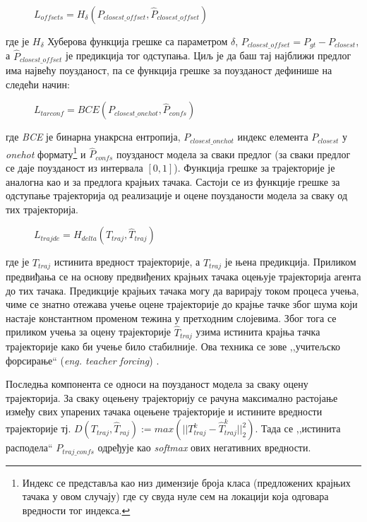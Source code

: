 \documentclass[11pt,oneside]{memoir}
\begin{document}
\begin{figure}[H]
  \centering
  $L_{offsets} = H_{\delta}(P_{closest\_offset}, \hat{P}_{closest\_offset})$
\end{figure}

\noindent где је $H_{\delta}$ Хуберова функција грешке са параметром $\delta$, $P_{closest\_offset} = P_{gt} - P_{closest}$,
а $\hat{P}_{closest\_offset}$ је предикција тог одступања. Циљ је да баш тај најближи предлог има највећу поузданост, па се функција грешке за 
поузданост дефинише на следећи начин:

\begin{figure}[H]
  \centering
  $L_{tarconf} = BCE(P_{closest\_onehot}, \hat{P}_{confs})$
\end{figure}

\noindent где \textit{BCE} је бинарна унакрсна ентропија, $P_{closest\_onehot}$ индекс елемента $P_{closest}$ у \textit{onehot} 
формату\footnote{Индекс се представља као низ димензије броја класа (предложених крајњих тачака у овом случају) где су свуда нуле сем на локацији која одговара
вредности тог индекса.} и $\hat{P}_{confs}$ поузданост модела за сваки предлог (за сваки предлог се даје поузданост из интервала $[0, 1]$). Функција грешке за
трајекторије је аналогна као и за предлога крајњих тачака. Састоји се из функције грешке за одступање трајекторија од реализације и оцене
поузданости модела за сваку од тих трајекторија.

\begin{figure}[H]
  \centering
  $L_{trajde} = H_{delta} (T_{traj}, \hat{T}_{traj})$
\end{figure}

\noindent где је $T_{traj}$ истинита вредност трајекторије, а $\hat{T}_{traj}$ је њена предикција. Приликом предвиђања се
на основу предвиђених крајњих тачака оцењује трајекторија агента до тих тачака. Предикције крајњих тачака могу да варирају током процеса учења,
чиме се знатно отежава учење оцене трајекторије до крајње тачке због шума који настаје константном променом тежина у претходним слојевима.
Због тога се приликом учења за оцену трајекторије
$\hat{T}_{traj}$ узима истинита крајња тачка трајекторије како би учење било стабилније. Ова техника се зове ,,учитељско форсирање`` (\textit{eng. teacher forcing}) \cite{teacher_forcing}.

Последња компонента се односи на поузданост модела за сваку оцену трајекторија. За сваку оцењену трајекторију се рачуна максимално растојање
између свих упарених тачака оцењене трајекторије и истините вредности трајекторије тј.
$D(T_{traj}, \hat{T}_{raj}) := max(||T^{k}_{traj} - \hat{T}^{k}_{traj}||^{2}_{2})$. Тада се ,,истинита расподела`` $P_{traj\_confs}$ одређује као \textit{softmax} 
ових негативних вредности.
\end{document}
